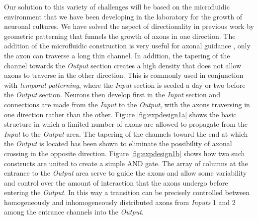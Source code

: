 Our solution to this variety of challenges will be based on the microfluidic environment that we have been developing in the laboratory for the growth of neuronal cultures. We have solved the aspect of directionality in previous work \cite{Feinerman2008} by geometric patterning that funnels the growth of axons in one direction. The addition of the microfluidic construction is very useful for axonal guidance \cite{Peyrin2011,Park2006,Taylor2005}, only the axon can traverse a long thin channel. In addition, the tapering of the channel towards the {\it Output} section creates a high density that does not allow axons to traverse in the other direction. This is commonly used in conjunction with {\it temporal patterning}, where the {\it Input} section is seeded a day or two before the {\it Output} section. Neurons then develop first in the {\it Input} section and connections are made from the {\it Input} to the {\it Output}, with the axons traversing in one direction rather than the other.
Figure \ref{fig:expdesign1a} shows the basic structure in which a limited number of axons are allowed to propagate from the {\it Input} to the {\it Output} area. The tapering of the channels toward the end at which the {\it Output} is located has been shown \cite{Peyrin2011} to eliminate the possibility of axonal crossing in the opposite direction. Figure \ref{fig:expdesign1b} shows how two such constructs are united to create a simple AND gate. The array of columns at the entrance to the {\it Output} area serve to guide the axons and allow some variability and control over the amount of interaction that the axons undergo before entering the {\it Output}. In this way a transition can be precisely controlled between homogeneously and inhomogeneously distributed axons from {\it Inputs} 1 and 2 among the entrance channels into the {\it Output}.

